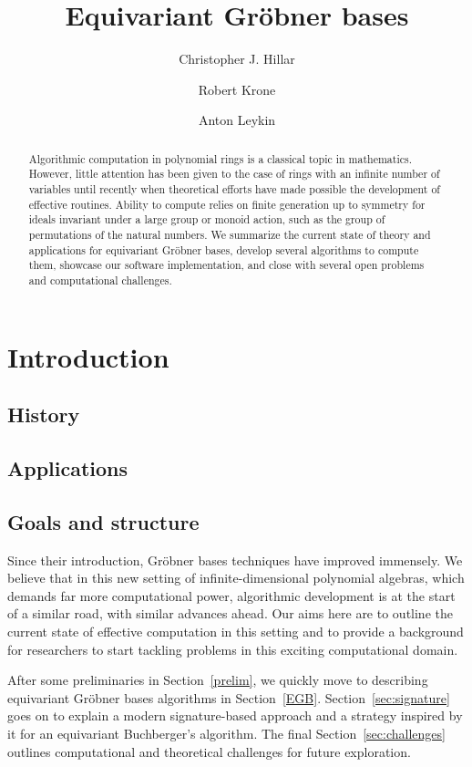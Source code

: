\documentclass[]{aspm}
\title[]{Equivariant Gr\"obner bases}
\author[C.~Hillar]{Christopher J. Hillar}
\author[R.~Krone]{Robert Krone}
\author[A. Leykin]{Anton Leykin}
\begin{document}
\begin{abstract}
 Algorithmic computation in polynomial rings is a classical topic in mathematics. However, little attention has been given to the case of rings with an infinite number of variables until recently when theoretical efforts have made possible the development of effective routines. Ability to compute relies on finite generation up to symmetry for ideals invariant under a large group or monoid action, such as the group of permutations of the natural numbers. We summarize the current state of theory and applications for equivariant Gr\"obner bases, develop several algorithms to compute them, showcase our software implementation, and close with several open problems and computational challenges.
\end{abstract}


\maketitle 
\section{Introduction}
\subsection{History}



\subsection{Applications}



\subsection{Goals and structure}

Since their introduction, Gr\"obner bases techniques have improved immensely.  We believe that in this new setting of infinite-dimensional polynomial algebras, which demands far more computational power, algorithmic development is at the start of a similar road, with similar advances ahead. Our aims here are to outline the current state of effective computation in this setting and to provide a background for researchers to start tackling problems in this exciting computational domain. 

After some preliminaries in Section~\ref{prelim}, we quickly move to describing equivariant Gr\"obner bases algorithms in Section~\ref{EGB}.  Section~\ref{sec:signature} goes on to explain a modern signature-based approach and a strategy inspired by it for an equivariant Buchberger's algorithm. The final Section~\ref{sec:challenges} outlines computational and theoretical challenges for future exploration.
\end{document}
